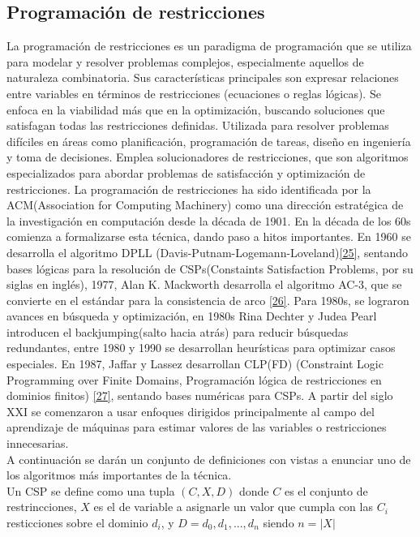     \subsection*{ \Large Programación de restricciones}

La programación de restricciones es un paradigma de programación que se utiliza para modelar y resolver problemas complejos, especialmente aquellos de naturaleza
combinatoria. Sus características principales son expresar relaciones entre variables en términos de restricciones (ecuaciones o reglas lógicas). Se enfoca en la
viabilidad más que en la optimización, buscando soluciones que satisfagan todas las restricciones definidas. Utilizada para resolver problemas difíciles en áreas
como planificación, programación de tareas, diseño en ingeniería y toma de decisiones. Emplea solucionadores de restricciones, que son algoritmos especializados
para abordar problemas de satisfacción y optimización de restricciones. La programación de restricciones ha sido identificada por la ACM(Association for Computing Machinery) como una dirección estratégica
de la investigación en computación desde la década de 1901. En la década de los 60s comienza a formalizarse esta técnica, dando paso a hitos importantes. En 1960
se desarrolla el algoritmo DPLL (Davis-Putnam-Logemann-Loveland)\hyperref[sec:35]{[25]}, sentando bases lógicas para la resolución de CSPs(Constaints Satisfaction Problems, por su siglas en inglés), 1977, Alan K. Mackworth
desarrolla el algoritmo AC-3, que se convierte en el estándar para la consistencia de arco \hyperref[sec:36]{[26]}. Para 1980s, se lograron avances en búsqueda y optimización, en 1980s Rina
Dechter y Judea Pearl introducen el backjumping(salto hacia atrás) para reducir búsquedas redundantes, entre 1980 y 1990 se desarrollan heurísticas para optimizar
casos especiales. En 1987, Jaffar y Lassez desarrollan CLP(FD) (Constraint Logic Programming over Finite Domains, Programación lógica de restricciones en dominios finitos) 
\hyperref[sec:37]{[27]}, sentando bases numéricas para CSPs. A partir del siglo XXI se comenzaron a usar enfoques dirigidos principalmente al campo del aprendizaje de máquinas para estimar valores de las variables o restricciones innecesarias. \\

A continuación se darán un conjunto de definiciones con vistas a enunciar uno de los algoritmos más importantes de la técnica. \\

Un CSP se define como una tupla $(C,X,D)$ donde $C$ es el conjunto de restrincciones, $X$ es el de variable a asignarle un valor que cumpla con las $C_i$ resticciones 
sobre el dominio $d_i$, y $D={d_0,d_1,...,d_n}$ siendo $n=|X|$ \\

